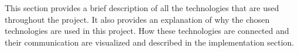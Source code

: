 This section provides a brief description of all the technologies that are used throughout the project. It also provides an explanation of why the chosen technologies are used in this project. How these technologies are connected and their communication are visualized and described in the implementation section.